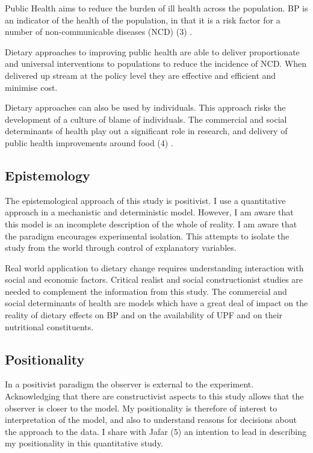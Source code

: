 \documentclass[
]{article}
\begin{document}
Public Health aims to reduce the burden of ill health across the
population. BP is an indicator of the health of the population, in that
it is a risk factor for a number of non-communicable diseases (NCD) (3)
.

Dietary approaches to improving public health are able to deliver
proportionate and universal interventions to populations to reduce the
incidence of NCD. When delivered up stream at the policy level they are
effective and efficient and minimise cost.

Dietary approaches can also be used by individuals. This approach risks
the development of a culture of blame of individuals. The commercial and
social determinants of health play out a significant role in research,
and delivery of public health improvements around food (4) .

\hypertarget{epistemology}{%
\subsection{Epistemology}\label{epistemology}}

The epistemological approach of this study is positivist. I use a
quantitative approach in a mechanistic and deterministic model. However,
I am aware that this model is an incomplete description of the whole of
reality. I am aware that the paradigm encourages experimental isolation.
This attempts to isolate the study from the world through control of
explanatory variables.

Real world application to dietary change requires understanding
interaction with social and economic factors. Critical realist and
social constructionist studies are needed to complement the information
from this study. The commercial and social determinants of health are
models which have a great deal of impact on the reality of dietary
effects on BP and on the availability of UPF and on their nutritional
constituents.

\hypertarget{positionality}{%
\subsection{Positionality}\label{positionality}}

In a positivist paradigm the observer is external to the experiment.
Acknowledging that there are constructivist aspects to this study allows
that the observer is closer to the model. My positionality is therefore
of interest to interpretation of the model, and also to understand
reasons for decisions about the approach to the data. I share with Jafar
(5) an intention to lead in describing my positionality in this
quantitative study.
\end{document}
